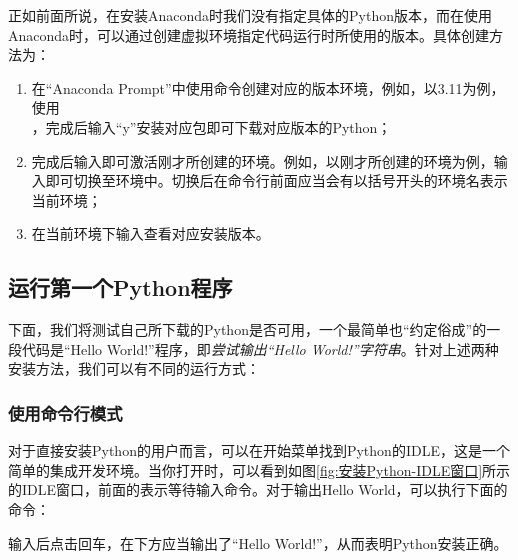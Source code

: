 \begin{extend}
    正如前面所说，在安装Anaconda时我们没有指定具体的Python版本，而在使用Anaconda时，可以通过创建虚拟环境指定代码运行时所使用的版本。具体创建方法为：

    \begin{enumerate}
        \item 在“Anaconda Prompt”中使用命令创建对应的版本环境，例如，以3.11为例，使用\\，完成后输入“y”安装对应包即可下载对应版本的Python；
        \item 完成后输入即可激活刚才所创建的环境。例如，以刚才所创建的环境为例，输入即可切换至环境中。切换后在命令行前面应当会有以括号开头的环境名表示当前环境；
        \item 在当前环境下输入查看对应安装版本。
    \end{enumerate}
\end{extend}

\subsection{运行第一个Python程序}\label{subsec:安装Python-运行第一个Python程序}

下面，我们将测试自己所下载的Python是否可用，一个最简单也“约定俗成”的一段代码是“Hello World!”程序，即\emph{尝试输出“Hello World!”字符串}。针对上述两种安装方法，我们可以有不同的运行方式：

\subsubsection{使用命令行模式}

对于直接安装Python的用户而言，可以在开始菜单找到Python的IDLE，这是一个简单的集成开发环境。当你打开时，可以看到如图\ref{fig:安装Python-IDLE窗口}所示的IDLE窗口，前面的\code{>>>}表示等待输入命令。对于输出Hello World，可以执行下面的命令：


输入后点击回车，在下方应当输出了“Hello World!”，从而表明Python安装正确。

